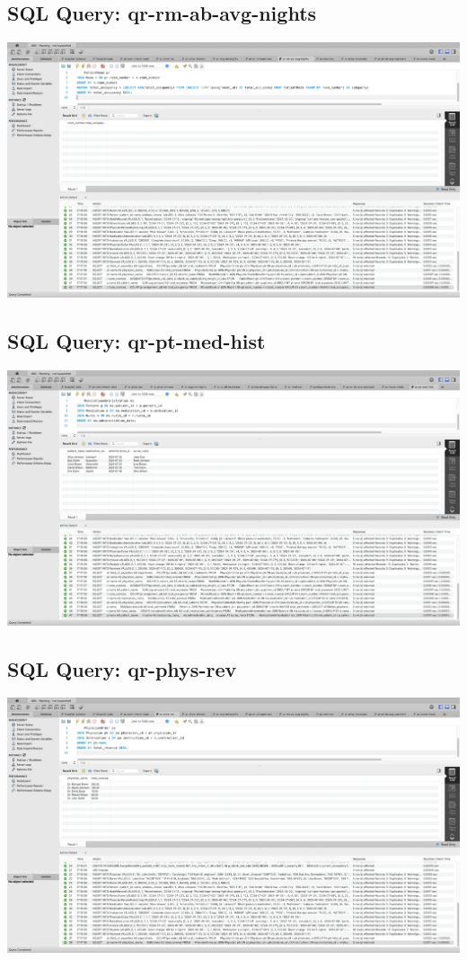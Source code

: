 \documentclass[a4paper,11pt]{article}
\theoremstyle{mytheor}
\begin{document}
\subsection{SQL Query: qr-rm-ab-avg-nights}
\includegraphics[width=\textwidth]{Screenshots/SCR-20240727-peor.png}

\subsection{SQL Query: qr-pt-med-hist}
\includegraphics[width=\textwidth]{Screenshots/SCR-20240727-pexw.png}

\subsection{SQL Query: qr-phys-rev}
\includegraphics[width=\textwidth]{Screenshots/SCR-20240727-peig.png}
\end{document}
